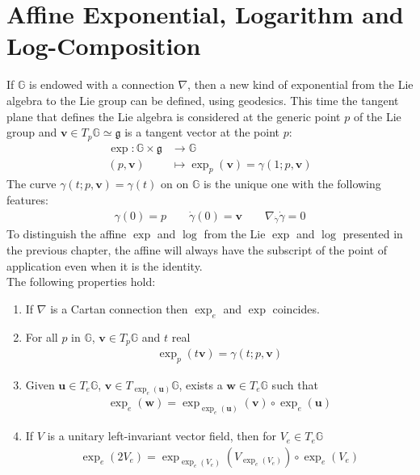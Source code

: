 \section{Affine Exponential, Logarithm and Log-Composition}
If $\mathbb{G} $ is endowed with a connection $\nabla$, then a new kind of exponential from the Lie algebra to the Lie group can be defined, using geodesics. This time the tangent plane that defines the Lie algebra is considered at the generic point $p$ of the Lie group and $\mathbf{v} \in T_{p}\mathbb{G}\simeq \mathfrak{g}$ is a tangent vector at the point $p$: 
\begin{align*}
	\exp :  \mathbb{G}  \times \mathfrak{g}     &\longrightarrow \mathbb{G}  
	\\ 
	(p,\mathbf{v}) &\longmapsto \exp_{p}(\mathbf{v})  = \gamma(1; p,\mathbf{v})
\end{align*}
The curve $\gamma(t;p,\mathbf{v}) = \gamma(t)$ on on $\mathbb{G}$ is the unique one with the following features:  
\begin{align*}
  \gamma(0) = p\qquad  \dot{\gamma}(0) =  \mathbf{v} \qquad \nabla_{\dot{\gamma}}\dot{\gamma} = 0 
\end{align*}
To distinguish the affine $\exp$ and $\log$ from the Lie $\exp$ and $\log$ presented in the previous chapter, the affine will always have the subscript of the point of application even when it is the identity.\\
The following properties hold:
\begin{enumerate}
	\item If $\nabla$ is a Cartan connection then $\exp_{e}$ and $\exp$ coincides.
	\item For all $p$ in $\mathbb{G}$, $\mathbf{v} \in T_{p}\mathbb{G}$ and $t$ real
	\begin{align*}
	 \exp _{p}(t\mathbf{v})  = \gamma(t; p,\mathbf{v})
	\end{align*}
	\item Given $\mathbf{u} \in T_{e}\mathbb{G}$, $\mathbf{v} \in T_{\exp _{e}(\mathbf{u})}\mathbb{G}$, exists a $\mathbf{w} \in T_{e}\mathbb{G}$ such that 
	\begin{align*}
	\exp_{e}(\mathbf{w})  = \exp_{\exp _{e}(\mathbf{u})}(\mathbf{v}) \circ  \exp _{e}(\mathbf{u})
	\end{align*}
	\item If $V$ is a unitary left-invariant vector field, then for $V_{e} \in T_{e}\mathbb{G}$
	\begin{align*}
	\exp_{e}(2V_{e})  = \exp_{\exp _{e}(V_{e})}(V_{\exp _{e}(V_{e})}) \circ  \exp _{e}(V_{e})
	\end{align*}
\end{enumerate}
